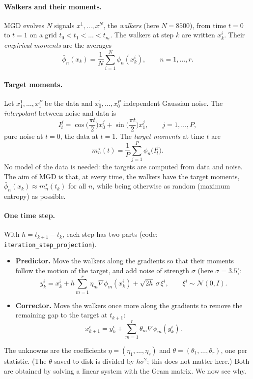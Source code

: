 \documentclass[11pt,a4paper]{article}
\newcommand{\code}[1]{\texttt{#1}}
\begin{document}
\paragraph{Walkers and their moments.} MGD evolves $N$ signals $x^1,\dots,x^N$, the
\emph{walkers} (here $N=8500$), from time $t=0$ to $t=1$ on a grid $t_0<t_1<\dots<t_{n_t}$.
The walkers at step $k$ are written $x_k^i$. Their \emph{empirical moments} are the averages
\[
  \bar\phi_n(x_k)=\frac1N\sum_{i=1}^N\phi_n(x_k^i),\qquad n=1,\dots,r .
\]

\paragraph{Target moments.} Let $x_1^1,\dots,x_1^P$ be the data and $x_0^1,\dots,x_0^P$ independent
Gaussian noise. The \emph{interpolant} between noise and data is
\[
  I_t^j=\cos\!\Big(\frac{\pi t}{2}\Big)x_0^j+\sin\!\Big(\frac{\pi t}{2}\Big)x_1^j,\qquad j=1,\dots,P,
\]
pure noise at $t=0$, the data at $t=1$. The \emph{target moments} at time $t$ are
\[
  m^\star_n(t)=\frac1P\sum_{j=1}^P\phi_n\big(I_t^j\big).
\]
No model of the data is needed: the targets are computed from data and noise.
The aim of MGD is that, at every time, the walkers have the target moments,
$\bar\phi_n(x_k)\approx m^\star_n(t_k)$ for all $n$, while being otherwise as random
(maximum entropy) as possible.

\paragraph{One time step.} With $h=t_{k+1}-t_k$, each step has two parts (code:
\code{iteration\_step\_projection}).
\begin{itemize}
  \item \textbf{Predictor.} Move the walkers along the gradients so that their moments follow
    the motion of the target, and add noise of strength $\sigma$ (here $\sigma=3.5$):
    \[
      y_k^i=x_k^i+h\sum_{m=1}^r\eta_m\nabla\phi_m(x_k^i)+\sqrt{2h}\,\sigma\,\xi^i,
      \qquad \xi^i\sim\mathcal N(0,I).
    \]
  \item \textbf{Corrector.} Move the walkers once more along the gradients to remove the
    remaining gap to the target at $t_{k+1}$:
    \begin{equation}
      x_{k+1}^i=y_k^i+\sum_{m=1}^r\theta_m\nabla\phi_m(y_k^i).
      \label{eq:corrector}
    \end{equation}
\end{itemize}
The unknowns are the coefficients $\eta=(\eta_1,\dots,\eta_r)$ and $\theta=(\theta_1,\dots,\theta_r)$,
one per statistic. (The $\theta$ saved to disk is divided by $h\sigma^2$; this does not
matter here.) Both are obtained by solving a linear system with the Gram matrix. We now see why.
\end{document}
